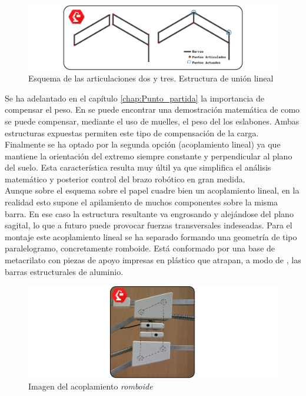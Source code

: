     \begin{figure}[H]
    	\centering
    	\includegraphics[width=\textwidth]{figuras/Imagenes_Mecanica/mecanismos_4_barras.jpg}
    	\caption{Esquema de las articulaciones dos y tres. Estructura de unión lineal}
    	\label{fig:Mecanica:4_bar_mecanism}
    \end{figure}

    Se ha adelantado en el capítulo \ref{chap:Punto_partida} la importancia de compensar el peso. En \cite{Rahman_asimple} se puede encontrar una demostración matemática de como se puede compensar, mediante el uso de muelles, el peso del los eslabones. Ambas estructuras expuestas permiten este tipo de compensación de la carga. Finalmente se ha optado por la segunda opción (acoplamiento lineal) ya que mantiene la orientación del extremo siempre constante y perpendicular al plano del suelo. Esta característica resulta muy últil ya que simplifica el análisis matemático y posterior control del brazo robótico en gran medida.
    \\

    Aunque sobre el esquema sobre el papel cuadre bien un acoplamiento lineal, en la realidad esto supone el apilamiento de muchos componentes sobre la misma barra. En ese caso la estructura resultante va engrosando y alejándose del plano sagital, lo que a futuro puede provocar fuerzas transversales indeseadas. Para el montaje este acoplamiento lineal se ha separado formando una geometría de tipo paralelogramo, concretamente romboide. Está conformado por una base de metacrilato con piezas de apoyo impresas en plástico que atrapan, a modo de , las barras estructurales de aluminio.

    \begin{figure}[H]
        \centering
        \includegraphics[width=\textwidth]{figuras/Imagenes_Mecanica/acoplamiento_romboide.jpg}
        \caption{Imagen del acoplamiento \textit{romboide}}
        \label{fig:Mecanica:acoplamiento_romboide}
    \end{figure}

